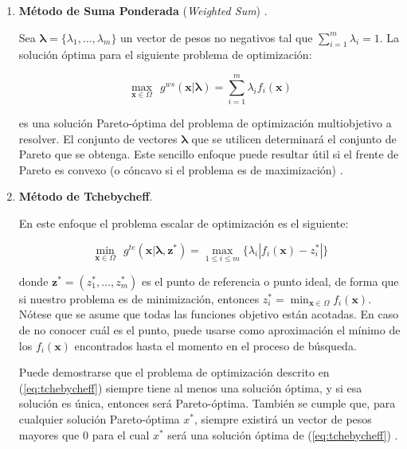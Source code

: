 \begin{enumerate}
	\item \textbf{Método de Suma Ponderada} (\emph{Weighted Sum}) .
	
	Sea $\boldsymbol\lambda = \{\lambda_1,\dots,\lambda_m\}$ un vector de pesos no negativos tal que $\sum_{i=1}^m \lambda_i = 1$. La solución óptima para el siguiente problema de optimización:
	
	\begin{equation}
		\max_{\textbf{x} \in \Omega}{~~g^{ws}(\textbf{x} | \boldsymbol\lambda) = \sum^{m}_{i=1} \lambda_i f_i(\textbf{x})}
	\end{equation}
	
	es una solución Pareto-óptima del problema de optimización multiobjetivo a resolver. El conjunto de vectores $\boldsymbol\lambda$ que se utilicen determinará el conjunto de Pareto que se obtenga. Este sencillo enfoque puede resultar útil si el frente de Pareto es convexo (o cóncavo si el problema es de maximización) \cite{miettinen2012nonlinear}.%
	
	\item \textbf{Método de Tchebycheff}.
	
	En este enfoque el problema escalar de optimización es el siguiente:
	
	\begin{equation}\label{eq:tchebycheff}
		\min_{\textbf{x} \in \Omega}{~~g^{te}(\textbf{x} | \boldsymbol\lambda, \textbf{z}^*) = \max_{1 \leq i \leq m}{ \{\lambda_i |f_i(\textbf{x}) - z^*_i|\} }}
	\end{equation}
	
	donde $\textbf{z}^* = (z^*_1,\dots,z^*_m)$ es el punto de referencia o punto ideal, de forma que si nuestro problema es de minimización, entonces $z^*_i = \min_{\textbf{x} \in \Omega}{f_i(\textbf{x})}$. Nótese que se asume que todas las funciones objetivo están acotadas. En caso de no conocer cuál es el punto, puede usarse como aproximación el mínimo de los $f_i(\textbf{x})$ encontrados hasta el momento en el proceso de búsqueda.
	
	Puede demostrarse que el problema de optimización descrito en (\ref{eq:tchebycheff}) siempre tiene al menos una solución óptima, y si esa solución es única, entonces será Pareto-óptima. También se cumple que, para cualquier solución Pareto-óptima $x^*$, siempre existirá un vector de pesos mayores que $0$ para el cual $x^*$ será una solución óptima de (\ref{eq:tchebycheff}) \cite{miettinen2012nonlinear}.
	

\end{enumerate}
